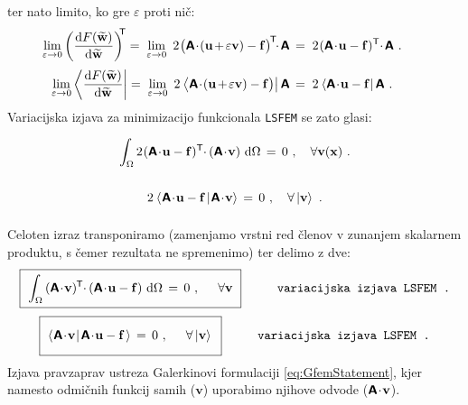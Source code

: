 ter nato limito, ko gre $\varepsilon$ proti nič:
\begin{equation*}
	\hspace{-7mm}
	\lim_{\varepsilon \rightarrow 0} \left(\frac{\ud F(\widetilde{\mathbf{w}})}{\ud \widetilde{\mathbf{w}}}\right)^\mathsf{\mkern-7mu T}
	=
	\mkern5mu \lim_{\varepsilon \rightarrow 0} \ 2 \mkern1mu \big(\mathbsf{A} \! \cdot \! (\mathbf{u} \mkern-2mu + \mkern-2mu \varepsilon \mathbf{v}) - \mathbf{f}\big)^\mathsf{\mkern-2mu T} \mkern-6mu \cdot \mkern-2mu \mathbsf{A}\,
	=
	\mkern5mu 2 \mkern1mu (\mathbsf{A} \! \cdot \! \mathbf{u} - \mathbf{f})^\mathsf{T} \mkern-4mu \cdot \mkern-2mu \mathbsf{A} \ .
\end{equation*}
\begin{equation*}
	\hspace{-7mm}
	\lim_{\varepsilon \rightarrow 0} \bra{\frac{\ud F(\widetilde{\mathbf{w}})}{\ud \widetilde{\mathbf{w}}}}
	=
	\mkern5mu \lim_{\varepsilon \rightarrow 0} \ 2 \mkern1mu \bra{\mathbsf{A} \! \cdot \! (\mathbf{u} \mkern-2mu + \mkern-2mu \varepsilon \mathbf{v}) - \mathbf{f}\big)} \mathbsf{A}\,
	=
	\mkern5mu 2 \mkern1mu \bra{\mathbsf{A} \! \cdot \! \mathbf{u} - \mathbf{f}} \mathbsf{A} \ .
\end{equation*}
Variacijska izjava za minimizacijo funkcionala \texttt{LSFEM} se zato glasi:
\begin{equation*}
	\int_{\Omega} 2 \mkern1mu (\mathbsf{A} \! \cdot \! \mathbf{u} - \mathbf{f})^\mathsf{T} \mkern-4.5mu \cdot \mkern-1mu (\mathbsf{A} \! \cdot \! \mathbf{v}) \ \ud \Omega \, = \, 0 \ , \quad \forall \mathbf{v(\mathbf{x})} \ . \vphantom{\Biggr{)}}
\end{equation*}
\begin{equation*}
	2 \mkern1mu \bra{\mkern1mu \mathbsf{A} \! \cdot \! \mathbf{u} - \mathbf{f} \mkern2mu}\ket{\mkern1mu \mathbsf{A} \! \cdot \! \mathbf{v}} \, = \, 0 \ , \quad \forall \ket{\mathbf{v}} \ . \vphantom{\Biggr{)}}
\end{equation*}
Celoten izraz transponiramo (zamenjamo vrstni red členov v zunanjem skalarnem produktu, s čemer rezultata ne spremenimo) ter delimo z dve:
\begin{equation}
	\boxed{\
		\int_{\Omega} \, (\mathbsf{A} \! \cdot \! \mathbf{v})^\mathsf{\mkern-1mu T} \mkern-4.5mu \cdot \mkern-1mu (\mathbsf{A} \! \cdot \! \mathbf{u} - \mathbf{f}) \ \ud \Omega \, = \,
		0 \ , \hspace{5mm} \forall \mathbf{v} \vphantom{\bigg{)}} \
	}
	\hspace{10mm} \texttt{variacijska izjava LSFEM .}
	\label{eq:LsfemVariationalStatement}
\end{equation}
\begin{equation}
	\boxed{\
		\bra{\mkern1mu \mathbsf{A} \! \cdot \! \mathbf{v} \mkern1mu}\ket{\mkern2mu \mathbsf{A} \! \cdot \! \mathbf{u} - \mathbf{f} \mkern2mu} \, = \,
		0 \ , \hspace{5mm} \forall \ket{\mathbf{v}} \vphantom{\bigg{)}} \
	}
	\hspace{10mm} \texttt{variacijska izjava LSFEM .}
	\label{eq:LsfemVariationalStatement}
\end{equation}
Izjava pravzaprav ustreza Galerkinovi formulaciji \eqref{eq:GfemStatement}, kjer namesto odmičnih funkcij samih ($\mathbf{v}$) uporabimo njihove odvode ($\bm{\mathsf{A}} \! \cdot \! \mathbf{v}$).